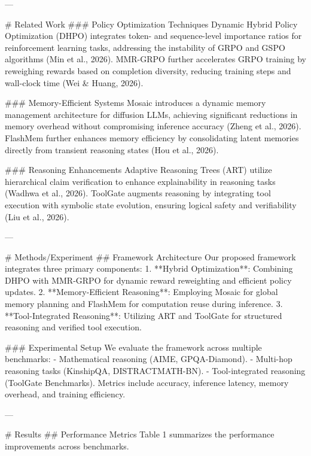 ---

# Related Work  
### Policy Optimization Techniques  
Dynamic Hybrid Policy Optimization (DHPO) integrates token- and sequence-level importance ratios for reinforcement learning tasks, addressing the instability of GRPO and GSPO algorithms (Min et al., 2026). MMR-GRPO further accelerates GRPO training by reweighing rewards based on completion diversity, reducing training steps and wall-clock time (Wei & Huang, 2026).  

### Memory-Efficient Systems  
Mosaic introduces a dynamic memory management architecture for diffusion LLMs, achieving significant reductions in memory overhead without compromising inference accuracy (Zheng et al., 2026). FlashMem further enhances memory efficiency by consolidating latent memories directly from transient reasoning states (Hou et al., 2026).  

### Reasoning Enhancements  
Adaptive Reasoning Trees (ART) utilize hierarchical claim verification to enhance explainability in reasoning tasks (Wadhwa et al., 2026). ToolGate augments reasoning by integrating tool execution with symbolic state evolution, ensuring logical safety and verifiability (Liu et al., 2026).  

---

# Methods/Experiment  
## Framework Architecture  
Our proposed framework integrates three primary components:  
1. **Hybrid Optimization**: Combining DHPO with MMR-GRPO for dynamic reward reweighting and efficient policy updates.  
2. **Memory-Efficient Reasoning**: Employing Mosaic for global memory planning and FlashMem for computation reuse during inference.  
3. **Tool-Integrated Reasoning**: Utilizing ART and ToolGate for structured reasoning and verified tool execution.  

### Experimental Setup  
We evaluate the framework across multiple benchmarks:  
- Mathematical reasoning (AIME, GPQA-Diamond).  
- Multi-hop reasoning tasks (KinshipQA, DISTRACTMATH-BN).  
- Tool-integrated reasoning (ToolGate Benchmarks).  
Metrics include accuracy, inference latency, memory overhead, and training efficiency.  

---

# Results  
## Performance Metrics  
Table 1 summarizes the performance improvements across benchmarks.  

